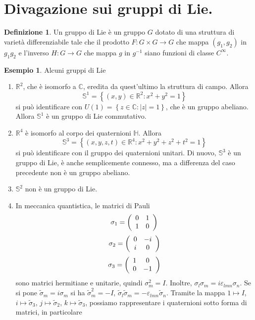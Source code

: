 \documentclass[a4paper,11pt]{article}
\theoremstyle{definition}
\newtheorem{definizione}{Definizione}[section]
\newtheorem{esempio}{Esempio}[section]
\theoremstyle{theorem}
\begin{document}
\section{Divagazione sui gruppi di Lie.}
\begin{definizione}
	Un gruppo di Lie è un gruppo $G$ dotato di una struttura di varietà differenziabile tale che il prodotto $F\colon G\times G\to G$ che mappa $(g_1,g_2)$ in $g_1g_2$ e l'inverso $H\colon G\to G$ che mappa $g$ in $g^{-1}$ siano funzioni di classe $C^\infty$.
\end{definizione}
\begin{esempio} Alcuni gruppi di Lie
	\begin{enumerate}
		\item $\mathbb{R}^2$, che è isomorfo a $\mathbb{C}$, eredita da quest'ultimo la struttura di campo. Allora \[\mathbb{S}^1=\left\{(x,y)\in\mathbb{R}^2:x^2+y^2=1\right\}\] si può identificare con $U(1)=\left\{z\in\mathbb{C}:|z|=1\right\}$, che è un gruppo abeliano. Allora $\mathbb{S}^1$ è un gruppo di Lie commutativo.
		\item $\mathbb{R}^4$ è isomorfo al corpo dei quaternioni $\mathbb{H}$. Allora \[\mathbb{S}^3=\left\{(x,y,z,t)\in\mathbb{R}^4:x^2+y^2+z^2+t^2=1\right\}\] si può identificare con il gruppo dei quaternioni unitari. Di nuovo, $\mathbb{S}^3$ è un gruppo di Lie, è anche semplicemente connesso, ma a differenza del caso precedente non è un gruppo abeliano. 
		\item $\mathbb{S}^2$ non è un gruppo di Lie.
		\item In meccanica quantistica, le matrici di Pauli
		\[\sigma_1=\left(\begin{array}{c c}
		0 & 1 \\
		1 & 0
		\end{array}\right)\]
		\[\sigma_2=\left(\begin{array}{c c}
		0 & -i \\
		i & 0
		\end{array}\right)\]
		\[\sigma_3=\left(\begin{array}{c c}
		1 & 0\\
		0 & -1
		\end{array}\right)\]
		sono matrici hermitiane e unitarie, quindi $\sigma_m^2=I$. Inoltre, $\sigma_l\sigma_m=i\varepsilon_{lmn}\sigma_n$. Se si pone $\tilde{\sigma}_m=i\sigma_m$ si ha $\tilde{\sigma}_m^2=-I$, $\tilde{\sigma}_l\tilde{\sigma}_m=-\varepsilon_{lmn}\tilde\sigma_n$.
		Tramite la mappa $1\mapsto I$, $i\mapsto\tilde{\sigma}_3$, $j\mapsto\tilde{\sigma}_2$, $k\mapsto\tilde{\sigma}_3$, possiamo rappresentare i quaternioni sotto forma di matrici, in particolare

\end{enumerate}
\end{esempio}
\end{document}
